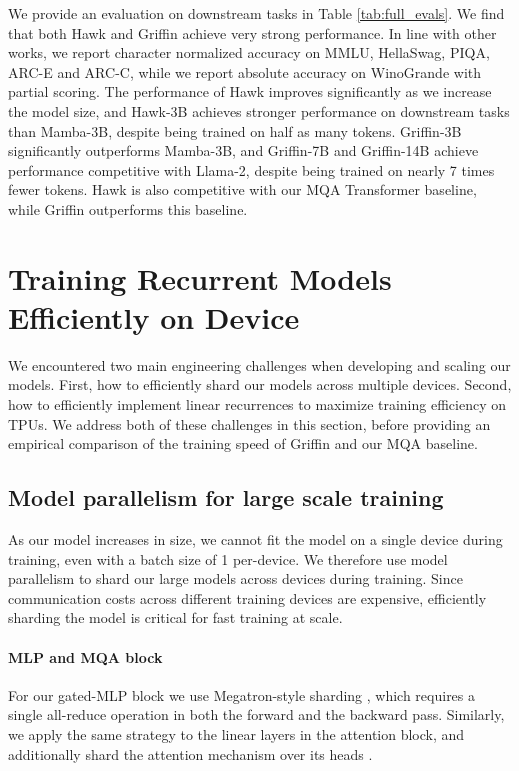 We provide an evaluation on downstream tasks in Table \ref{tab:full_evals}. 
We find that both Hawk and Griffin achieve very strong performance. In line with other works, we report character normalized accuracy on MMLU, HellaSwag, PIQA, ARC-E and ARC-C, while we report absolute accuracy on WinoGrande with partial scoring. The performance of Hawk improves significantly as we increase the model size, and Hawk-3B achieves stronger performance on downstream tasks than Mamba-3B, despite being trained on half as many tokens. Griffin-3B significantly outperforms Mamba-3B, and Griffin-7B and Griffin-14B achieve performance competitive with Llama-2, despite being trained on nearly 7 times fewer tokens. Hawk is also competitive with our MQA Transformer baseline, while Griffin outperforms this baseline.

\section{Training Recurrent Models Efficiently on Device}
\label{sec:training_efficiency}

We encountered two main engineering challenges when developing and scaling our models. First, how to efficiently shard our models across multiple devices. Second, how to efficiently implement linear recurrences to maximize training efficiency on TPUs. We address both of these challenges in this section, before providing an empirical comparison of the training speed of Griffin and our MQA baseline.

\subsection{Model parallelism for large scale training}

As our model increases in size, we cannot fit the model on a single device during training, even with a batch size of 1 per-device. We therefore use model parallelism to shard our large models across devices during training. Since communication costs across different training devices are expensive, efficiently sharding the model is critical for fast training at scale. 

\paragraph{MLP and MQA block} For our gated-MLP block we use Megatron-style sharding \citep{shoeybi2019megatron}, which requires  a single all-reduce operation in both the forward and the backward pass. Similarly, we apply the same strategy to the linear layers in the attention block, and additionally shard the attention mechanism over its heads  \citep{narayanan2021efficient}.

